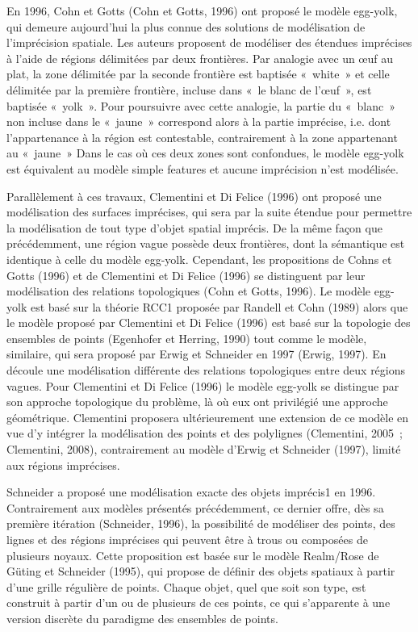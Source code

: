 En 1996, Cohn et Gotts (Cohn et Gotts, 1996) ont proposé le modèle
egg-yolk, qui demeure aujourd’hui la plus connue des solutions de
modélisation de l’imprécision spatiale. Les auteurs proposent de
modéliser des étendues imprécises à l’aide de régions délimitées par
deux frontières. Par analogie avec un œuf au plat, la zone délimitée
par la seconde frontière est baptisée « white » et celle délimitée par
la première frontière, incluse dans « le blanc de l’œuf », est
baptisée « yolk ». Pour poursuivre avec cette analogie, la partie du
« blanc » non incluse dans le « jaune » correspond alors à la partie
imprécise, i.e. dont l’appartenance à la région est contestable,
contrairement à la zone appartenant au « jaune » Dans le cas où ces
deux zones sont confondues, le modèle egg-yolk est équivalent au
modèle simple features et aucune imprécision n’est modélisée.

Parallèlement à ces travaux, Clementini et Di Felice (1996) ont
proposé une modélisation des surfaces imprécises, qui sera par la
suite étendue pour permettre la modélisation de tout type d’objet
spatial imprécis. De la même façon que précédemment, une région vague
possède deux frontières, dont la sémantique est identique à celle du
modèle egg-yolk. Cependant, les propositions de Cohns et Gotts (1996)
et de Clementini et Di Felice (1996) se distinguent par leur
modélisation des relations topologiques (Cohn et Gotts, 1996). Le
modèle egg-yolk est basé sur la théorie RCC1 proposée par Randell et
Cohn (1989) alors que le modèle proposé par Clementini et Di Felice
(1996) est basé sur la topologie des ensembles de points (Egenhofer et
Herring, 1990) tout comme le modèle, similaire, qui sera proposé par
Erwig et Schneider en 1997 (Erwig, 1997). En découle une modélisation
différente des relations topologiques entre deux régions vagues. Pour
Clementini et Di Felice (1996) le modèle egg-yolk se distingue par son
approche topologique du problème, là où eux ont privilégié une
approche géométrique. Clementini proposera ultérieurement une
extension de ce modèle en vue d’y intégrer la modélisation des points
et des polylignes (Clementini, 2005 ; Clementini, 2008), contrairement
au modèle d’Erwig et Schneider (1997), limité aux régions imprécises.

Schneider a proposé une modélisation exacte des objets imprécis1 en
1996. Contrairement aux modèles présentés précédemment, ce dernier
offre, dès sa première itération (Schneider, 1996), la possibilité de
modéliser des points, des lignes et des régions imprécises qui peuvent
être à trous ou composées de plusieurs noyaux. Cette proposition est
basée sur le modèle Realm/Rose de Güting et Schneider (1995), qui
propose de définir des objets spatiaux à partir d’une grille régulière
de points. Chaque objet, quel que soit son type, est construit à
partir d’un ou de plusieurs de ces points, ce qui s’apparente à une
version discrète du paradigme des ensembles de points.

